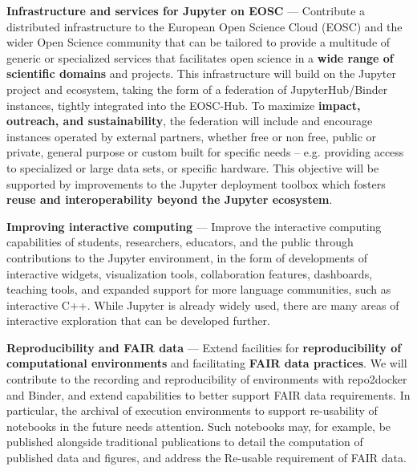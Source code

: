 \begin{compactenum}

\item \label{obj:deployment}
  \textbf{Infrastructure and services for Jupyter on EOSC} ---
  Contribute a distributed infrastructure to the European Open Science Cloud
  (EOSC) and the wider Open Science community that can be tailored to
  provide a multitude of generic or specialized services that facilitates
  open science in a \textbf{wide range of scientific domains} and projects.
  This infrastructure will build on the Jupyter project and ecosystem,
  taking the form of a federation of JupyterHub/Binder instances,
  tightly integrated into the EOSC-Hub.
  To maximize \textbf{impact, outreach, and sustainability},
  the federation will include and encourage instances operated by
  external partners, whether free or non free, public or private,
  general purpose or custom built for specific needs -- e.g.
  providing access to specialized or large data sets, or specific hardware.
  This objective will be supported by improvements to the Jupyter
  deployment toolbox which fosters \textbf{reuse and interoperability
    beyond the Jupyter ecosystem}.

\item \label{obj:interactivity}
  \textbf{Improving interactive computing} ---
  Improve the interactive computing capabilities of
  students, researchers, educators, and the public
  through contributions to the Jupyter environment,
  in the form of developments of interactive widgets,
  visualization tools, collaboration features, dashboards,
  teaching tools,
  and expanded support for more language communities,
  such as interactive C++.
  While Jupyter is already widely used,
  there are many areas
  of interactive exploration that can be developed further.

\item \label{obj:reusability}
  \textbf{Reproducibility and FAIR data} ---
  Extend facilities for
  \textbf{reproducibility of computational environments}
  and facilitating \textbf{FAIR data practices}.
  We will contribute to the recording and reproducibility
  of environments with repo2docker and Binder,
  and extend capabilities to better support FAIR
  data requirements. In particular, the archival of execution
  environments to support re-usability of notebooks in the future
  needs attention. Such notebooks may, for example, be published alongside
  traditional publications to detail the computation of published data
  and figures, and address the Re-usable requirement of FAIR data.


\end{compactenum}
